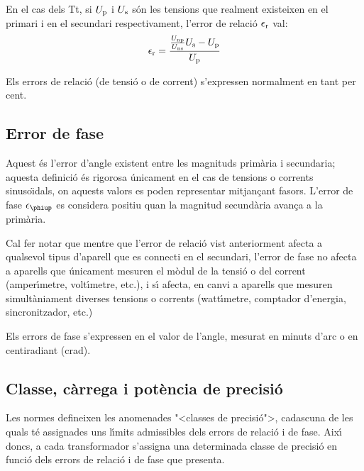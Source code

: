 En el cas dels Tt, si $U_\mathrm{p}$ i $U_\mathrm{s}$ s\'{o}n les tensions que
realment existeixen en el primari i en el secundari respectivament,
l'error de relaci\'{o} $\epsilon_\mathrm{r}$ val:
\begin{equation}
    \epsilon_\mathrm{r} = \frac{\frac{U_\mathrm{np}}{U_\mathrm{ns}} U_\mathrm{s} - U_\mathrm{p}} {U_\mathrm{p}}
\end{equation}

Els errors de relaci\'{o} (de tensi\'{o} o de corrent) s'expressen
normalment en tant per cent.

\subsection{Error de fase}

Aquest \'{e}s l'error d'angle  existent entre les magnituds prim\`{a}ria i
secundaria; aquesta definici\'{o} \'{e}s rigorosa \'{u}nicament en el cas de
tensions o corrents sinuso\"{\i}dals, on aquests valors es poden
representar mitjan\c{c}ant fasors. L'error de fase $\epsilon\ped{\phiup}$ es considera positiu quan la magnitud secund\`{a}ria avan\c{c}a a la prim\`{a}ria.
\index{$\epsilon\ped{\phiup}$}

 Cal fer notar que mentre que l'error de relaci\'{o}
vist anteriorment afecta a qualsevol tipus d'aparell que es
connecti en el secundari, l'error de fase no afecta a aparells que
\'{u}nicament mesuren el m\`{o}dul de la tensi\'{o} o del corrent (amper\'{\i}metre,
volt\'{\i}metre, etc.), i s\'{\i} afecta, en canvi a aparells que mesuren
simult\`{a}niament diverses tensions o corrents (watt\'{\i}metre, comptador
d'energia, sincronitzador, etc.)

Els errors de fase s'expressen en el valor de l'angle, mesurat en
minuts d'arc o en centiradiant (crad).

\subsection{Classe, c\`{a}rrega i pot\`{e}ncia de precisi\'{o}}

Les normes defineixen les anomenades {"<}classes de precisi\'{o}{">},
cadascuna de les quals t\'{e} assignades uns l\'{\i}mits admissibles dels
errors de relaci\'{o} i de fase. Aix\'{\i} doncs, a cada transformador
s'assigna una determinada classe de precisi\'{o} en funci\'{o} dels errors
de relaci\'{o} i de fase que presenta.

